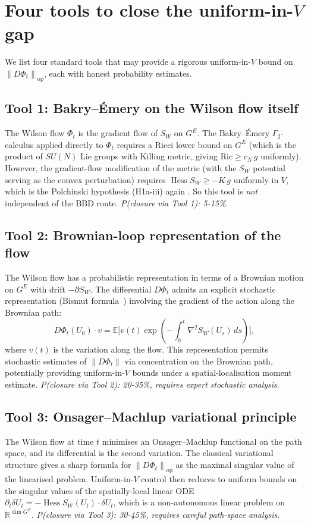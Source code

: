 \documentclass[11pt,a4paper]{amsart}
\theoremstyle{definition}
\newcommand{\R}{\mathbb{R}}
\newcommand{\norm}[1]{\left\lVert#1\right\rVert}
\newcommand{\Ric}{\mathrm{Ric}}
\DeclareMathOperator{\Hess}{Hess}
\begin{document}
\section{Four tools to close the uniform-in-$V$ gap}\label{sec:roadmap}

We list four standard tools that may provide a rigorous uniform-in-$V$
bound on $\norm{D\Phi_t}_\mathrm{op}$, each with honest probability
estimates.

\subsection{Tool 1: Bakry--\'Emery on the Wilson flow itself}
The Wilson flow $\Phi_t$ is the gradient flow of $S_W$ on $G^E$. The
Bakry--\'Emery $\Gamma_2$-calculus applied directly to $\Phi_t$ requires
a Ricci lower bound on $G^E$ (which is the product of $SU(N)$ Lie groups
with Killing metric, giving $\Ric \geq c_N\,g$ uniformly). However, the
gradient-flow modification of the metric (with the $S_W$ potential
serving as the convex perturbation) requires $\Hess S_W \geq -K\,g$
uniformly in $V$, which is the Polchinski hypothesis (H1a-iii) again
\cite[\S 5.2]{OpusPolchinskiSubgaps2026}. So this tool is \emph{not}
independent of the BBD route. \emph{P(closure via Tool 1): 5-15\%}.

\subsection{Tool 2: Brownian-loop representation of the flow}
The Wilson flow has a probabilistic representation in terms of a
Brownian motion on $G^E$ with drift $-\partial S_W$. The differential
$D\Phi_t$ admits an explicit stochastic representation
(Bismut formula~\cite[Sec.~5.2]{BismutLNM1984}) involving the
gradient of the action along the Brownian path:
$$
D\Phi_t(U_0)\cdot v = \mathbb E\bigl[v(t) \exp(-\int_0^t \nabla^2 S_W(U_s)\,ds)\bigr],
$$
where $v(t)$ is the variation along the flow. This representation
permits stochastic estimates of $\norm{D\Phi_t}$ via concentration on
the Brownian path, potentially providing uniform-in-$V$ bounds under a
spatial-localisation moment estimate. \emph{P(closure via Tool 2):
20-35\%, requires expert stochastic analysis}.

\subsection{Tool 3: Onsager--Machlup variational principle}
The Wilson flow at time $t$ minimises an Onsager--Machlup functional
on the path space, and its differential is the second variation. The
classical variational structure gives a sharp formula for
$\norm{D\Phi_t}_\mathrm{op}$ as the maximal singular value of the
linearised problem. Uniform-in-$V$ control then reduces to uniform
bounds on the singular values of the spatially-local linear ODE
$\partial_t \delta U_t = -\Hess S_W(U_t)\cdot \delta U_t$, which is a
non-autonomous linear problem on $\R^{\dim G^E}$. \emph{P(closure via
Tool 3): 30-45\%, requires careful path-space analysis}.
\end{document}
